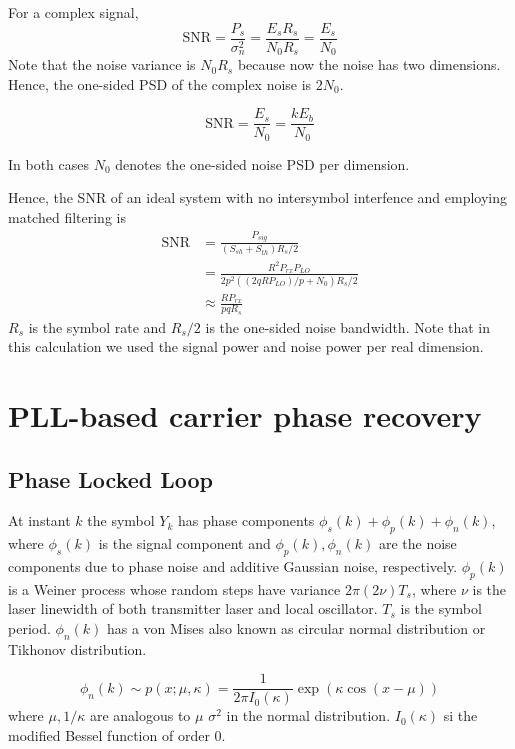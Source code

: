 \documentclass[a4paper]{article}
\begin{document}
For a complex signal, 
\begin{equation}
\mathrm{SNR} = \frac{P_s}{\sigma_n^2} = \frac{E_sR_s}{N_0R_s} = \frac{E_s}{N_0}
\end{equation}
Note that the noise variance is $N_0R_s$ because now the noise has two dimensions. Hence, the one-sided PSD of the complex noise is $2N_0$.

\begin{equation}
\mathrm{SNR} = \frac{E_s}{N_0} = \frac{kE_b}{N_0}
\end{equation}

In both cases $N_0$ denotes the one-sided noise PSD per dimension. 

Hence, the SNR of an ideal system with no intersymbol interfence and employing matched filtering is 
\begin{align} \nonumber
\mathrm{SNR} & = \frac{P_{sig}}{(S_{sh} + S_{th})R_s/2} \\ \nonumber
&= \frac{R^2P_{rx}P_{LO}}{2p^2((2qRP_{LO})/p + N_0)R_s/2} \\
&\approx \frac{RP_{rx}}{pqR_s} 
\end{align}
$R_s$ is the symbol rate and $R_s/2$ is the one-sided noise bandwidth. Note that in this calculation we used the signal power and noise power per real dimension.

\section{PLL-based carrier phase recovery}

\subsection{Phase Locked Loop}

At instant $k$ the symbol $Y_k$ has phase components $\phi_s(k) + \phi_p(k) + \phi_n(k)$, where $\phi_s(k)$ is the signal component and  $\phi_p(k), \phi_n(k)$ are the noise components due to phase noise and additive Gaussian noise, respectively. $\phi_p(k)$ is a Weiner process whose random steps have variance $2\pi(2\nu)T_s$, where $\nu$ is the laser linewidth of both transmitter laser and local oscillator. $T_s$ is the symbol period. $\phi_n(k)$ has a von Mises also known as circular normal distribution or Tikhonov distribution.

\begin{equation} \label{eq:Tikhonov-pdf}
	\phi_n(k) \sim p(x; \mu, \kappa) = \frac{1}{2\pi I_0(\kappa)}\exp(\kappa\cos(x-\mu))
\end{equation}
where $\mu, 1/\kappa$ are analogous to $\mu$ $\sigma^2$ in the normal distribution. $I_0(\kappa)$ si the modified Bessel function of order 0.
\end{document}
